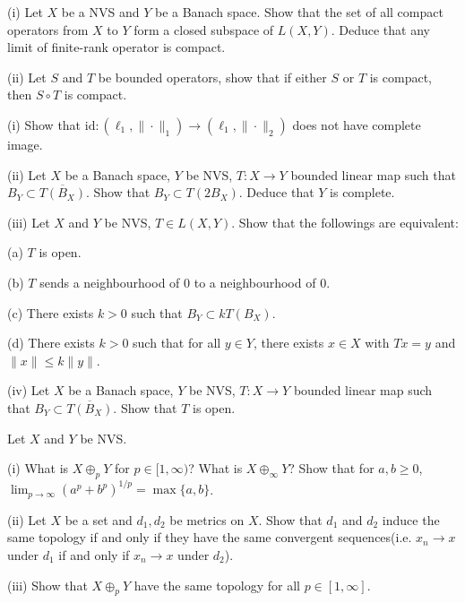 \documentclass[12pt]{article}
\newcommand{\id}{\text{id}}
\newenvironment{question}[2][Question]{\begin{trivlist}
\item[\hskip \labelsep {\bfseries #1}\hskip \labelsep {\bfseries #2.}]}{\end{trivlist}}
\begin{document}
\begin{question}{1.3(Compact Operator Properties)}
	(i) Let $X$ be a NVS and $Y$ be a Banach space. Show that the set of all compact operators from $X$ to $Y$ form a closed subspace of $L(X,Y)$. Deduce that any limit of finite-rank operator is compact.
	
	(ii) Let $S$ and $T$ be bounded operators, show that if either $S$ or $T$ is compact, then $S \circ T$ is compact.
\end{question}

\begin{question}{1.4(Open Mapping Lemma)}
	(i) Show that $\id: (\ell_1,\|\cdot\|_1) \rightarrow (\ell_1,\|\cdot\|_2)$ does not have complete image.
	
	(ii) Let $X$ be a Banach space, $Y$ be NVS, $T:X\rightarrow Y$ bounded linear map such that $B_Y\subset \overline{T(B_X)}$.  Show that $B_Y \subset T(2B_X)$. Deduce that $Y$ is complete.
	
\bigskip	
	
	(iii) Let $X$ and $Y$ be NVS, $T \in L(X,Y)$. Show that the followings are equivalent:
	
	(a) $T$ is open.
	
	(b) $T$ sends a neighbourhood of $0$ to a neighbourhood of $0$.
	
	(c) There exists $k>0$ such that $B_Y\subset kT(B_X)$.
	
	(d) There exists $k>0$ such that for all $y\in Y$, there exists $x \in X$ with $Tx = y$ and $\|x\| \leq k\|y\|$.
	
	\bigskip
	
	(iv) Let $X$ be a Banach space, $Y$ be NVS, $T:X\rightarrow Y$ bounded linear map such that $B_Y\subset \overline{T(B_X)}$.  Show that $T$ is open.
\end{question}


\begin{question}{1.5(Product of Normed Spaces)}
	Let $X$ and $Y$ be NVS. 
	
	(i) What is $X \oplus_p Y$ for $p \in [1,\infty)$? What is $X \oplus_\infty Y$? Show that for $a,b \geq 0$, $\lim_{p \rightarrow \infty} (a^p + b^p)^{1/p} = \max\{a,b\}$. 
	
	(ii) Let $X$ be a set and $d_1, d_2$ be metrics on $X$. Show that $d_1$ and $d_2$ induce the same topology if and only if they have the same convergent sequences(i.e. $x_n \rightarrow x$ under $d_1$ if and only if $x_n \rightarrow x$ under $d_2$).
	
	(iii) Show that $X\oplus_p Y$ have the same topology for all $p \in [1,\infty]$.
\end{question}
\end{document}
